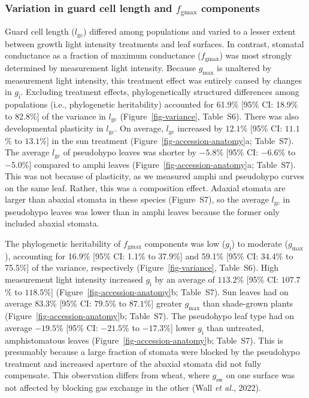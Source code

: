 \documentclass[
  letterpaper,
  DIV=11,
  numbers=noendperiod]{scrartcl}
\newcommand{\fgmax}{$f_\mathrm{gmax}$}
\newcommand{\gcl}{$l_\mathrm{gc}$}
\newcommand{\gi}{$g_\mathrm{i}$}
\newcommand{\gmax}{$g_\mathrm{max}$}
\newcommand{\gsw}{$g_\mathrm{sw}$}
\begin{document}
\subsubsection{\texorpdfstring{Variation in guard cell length and
\fgmax{}
components}{Variation in guard cell length and  components}}\label{variation-in-guard-cell-length-and-components}

Guard cell length (\gcl) differed among populations and varied to a
lesser extent between growth light intensity treatments and leaf
surfaces. In contrast, stomatal conductance as a fraction of maximum
conductance (\fgmax) was most strongly determined by measurement light
intensity. Because \gmax{} is unaltered by measurement light intensity,
this treatment effect was entirely caused by changes in \gi. Excluding
treatment effects, phylogenetically structured differences among
populations (i.e., phylogenetic heritability) accounted for 61.9\%
{[}95\% CI: 18.9\% to 82.8\%{]} of the variance in \gcl{}
(Figure~\ref{fig-variance}, Table~S6). There was also
developmental plasticity in \gcl. On average, \gcl{} increased by
\(12.1\)\% {[}95\% CI: \(11.1\)\% to \(13.1\)\%{]} in the sun treatment
(Figure~\ref{fig-accession-anatomy}a; Table~S7). The
average \gcl{} of pseudohypo leaves was shorter by \(-5.8\)\% {[}95\%
CI: \(-6.6\)\% to \(-5.0\)\%{]} compared to amphi leaves
(Figure~\ref{fig-accession-anatomy}a; Table~S7). This was
not because of plasticity, as we measured amphi and pseudohypo curves on
the same leaf. Rather, this was a composition effect. Adaxial stomata
are larger than abaxial stomata in these species (Figure~S7),
so the average \gcl{} in pseudohypo leaves was lower than in amphi
leaves because the former only included abaxial stomata.

The phylogenetic heritability of \fgmax{} components was low (\gi) to
moderate (\gmax), accounting for 16.9\% {[}95\% CI: 1.1\% to 37.9\%{]}
and 59.1\% {[}95\% CI: 34.4\% to 75.5\%{]} of the variance, respectively
(Figure~\ref{fig-variance}, Table~S6). High measurement
light intensity increased \gi{} by an average of \(113.2\)\% {[}95\% CI:
\(107.7\)\% to \(118.5\)\%{]} (Figure~\ref{fig-accession-anatomy}b;
Table~S7). Sun leaves had on average \(83.3\)\% {[}95\% CI:
\(79.5\)\% to \(87.1\)\%{]} greater \gmax{} than shade-grown plants
(Figure~\ref{fig-accession-anatomy}b; Table~S7). The
pseudohypo leaf type had on average \(-19.5\)\% {[}95\% CI: \(-21.5\)\%
to \(-17.3\)\%{]} lower \gi{} than untreated, amphistomatous leaves
(Figure~\ref{fig-accession-anatomy}b; Table~S7). This is
presumably because a large fraction of stomata were blocked by the
pseudohypo treatment and increased aperture of the abaxial stomata did
not fully compensate. This observation differs from wheat, where \gsw{}
on one surface was not affected by blocking gas exchange in the other
(Wall \emph{et al.}, 2022).
\end{document}
